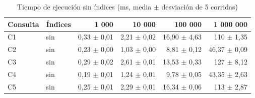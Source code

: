 \begin{table}[H]
\centering
\small
\caption{Tiempo de ejecución sin índices (ms, media $\pm$ desviación de 5 corridas)}
\label{tab:sin_indices}
\begin{tabular}{llrrrr}
\toprule
Consulta & Índices & 1 000 & 10 000 & 100 000 & 1 000 000 \\
\midrule
C1 & sin & 0,33 $\pm$ 0,01 & 2,21 $\pm$ 0,02 & 16,90 $\pm$ 4,63 & 110 $\pm$ 1,35 \\
\midrule
C2 & sin & 0,23 $\pm$ 0,00 & 1,03 $\pm$ 0,00 & 8,81 $\pm$ 0,12 & 46,37 $\pm$ 0,09 \\
\midrule
C3 & sin & 0,29 $\pm$ 0,02 & 2,61 $\pm$ 0,01 & 13,53 $\pm$ 0,33 & 127 $\pm$ 8,12 \\
\midrule
C4 & sin & 0,19 $\pm$ 0,01 & 1,24 $\pm$ 0,01 & 9,78 $\pm$ 0,05 & 43,35 $\pm$ 2,63 \\
\midrule
C5 & sin & 0,25 $\pm$ 0,01 & 2,29 $\pm$ 0,01 & 16,34 $\pm$ 0,06 & 113 $\pm$ 2,87 \\
\bottomrule
\end{tabular}
\end{table}
